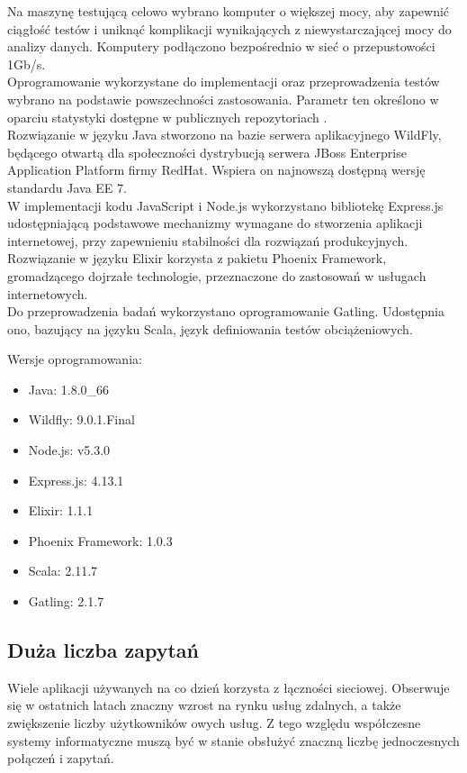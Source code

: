 \documentclass[12pt,twoside]{article}
\providecommand{\tightlist}{  \setlength{\itemsep}{0pt}\setlength{\parskip}{0pt}}
\begin{document}
Na maszynę testującą celowo wybrano komputer o większej mocy, aby
zapewnić ciągłość testów i uniknąć komplikacji wynikających z
niewystarczającej mocy do analizy danych. Komputery podłączono
bezpośrednio w sieć o przepustowości 1Gb/s.\\
Oprogramowanie wykorzystane do implementacji oraz przeprowadzenia testów
wybrano na podstawie powszechności zastosowania. Parametr ten określono
w oparciu statystyki dostępne w publicznych repozytoriach
\autocite{npm2015,mavenrepo2015, hex2015}.\\
Rozwiązanie w języku Java stworzono na bazie serwera aplikacyjnego
WildFly, będącego otwartą dla społeczności dystrybucją serwera JBoss
Enterprise Application Platform firmy RedHat. Wspiera on najnowszą
dostępną wersję standardu Java EE 7.\\
W implementacji kodu JavaScript i Node.js wykorzystano bibliotekę
Express.js udostępniającą podstawowe mechanizmy wymagane do stworzenia
aplikacji internetowej, przy zapewnieniu stabilności dla rozwiązań
produkcyjnych. Rozwiązanie w języku Elixir korzysta z pakietu Phoenix
Framework, gromadzącego dojrzałe technologie, przeznaczone do zastosowań
w usługach internetowych.\\
Do przeprowadzenia badań wykorzystano oprogramowanie Gatling. Udostępnia
ono, bazujący na języku Scala, język definiowania testów obciążeniowych.

Wersje oprogramowania:

\begin{itemize}
\tightlist
\item
  Java: 1.8.0\_66
\item
  Wildfly: 9.0.1.Final
\item
  Node.js: v5.3.0
\item
  Express.js: 4.13.1
\item
  Elixir: 1.1.1
\item
  Phoenix Framework: 1.0.3
\item
  Scala: 2.11.7
\item
  Gatling: 2.1.7
\end{itemize}

\subsection{Duża liczba zapytań}\label{duux17ca-liczba-zapytaux144}

Wiele aplikacji używanych na co dzień korzysta z łączności sieciowej.
Obserwuje się w ostatnich latach znaczny wzrost na rynku usług zdalnych,
a także zwiększenie liczby użytkowników owych usług. Z tego względu
współczesne systemy informatyczne muszą być w stanie obsłużyć znaczną
liczbę jednoczesnych połączeń i zapytań.
\end{document}
